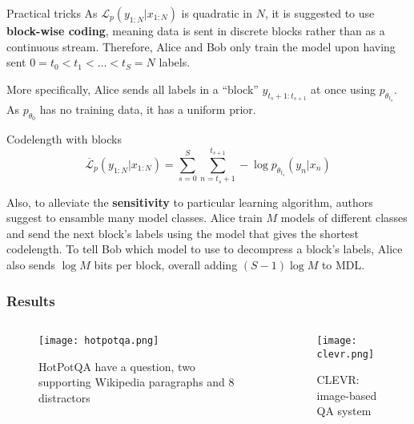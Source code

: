 \documentclass[10pt]{beamer}
\begin{document}
\begin{frame}{Practical tricks}
   As $\mathcal{L}_p(y_{1:N} |x_{1:N})$ is quadratic in $N$, it is suggested to use \textbf{block-wise coding}, meaning data is sent in discrete blocks rather than as a continuous stream. Therefore, Alice and Bob only train the model upon having sent $0 = t_0 <t_1 < \dots < t_S = N$ labels. 

   More specifically, Alice sends all labels in a ``block'' $y_{t_s+1:t_{s+1}}$ at once using $p_{\theta_{t_s}}$. As $p_{\theta_0}$ has no training data, it has a uniform prior.
    \begin{block}{Codelength with blocks}
         $$\overline{\mathcal{L}}_p(y_{1:N} |x_{1:N}) = \sum_{s=0}^S \sum_{n=t_s +1}^{t_{s +1}} -\log p_{\theta_{t_s}}(y_n |x_n)$$

    \end{block}
  



    Also, to alleviate the \textbf{sensitivity} to particular learning algorithm, authors suggest to ensamble many model classes. Alice train $M$ models of different classes and send the next block’s labels using the model that gives the shortest codelength. To tell Bob which model to use to decompress a block’s labels, Alice also sends $\log M$ bits per block, overall adding $(S  - 1) \log M$ to MDL.
\end{frame}

\begin{frame}
	\frametitle{Results}
\begin{columns}[onlytextwidth]
        \begin{column}{0.5\textwidth}
            \begin{figure}
                \centering
                \texttt{[image: hotpotqa.png]} 
                \caption{HotPotQA have a question, two supporting Wikipedia paragraphs and 8 distractors}
            \end{figure} 
        \end{column}
        \begin{column}{0.5\textwidth}
            \begin{figure}
                \centering
                \texttt{[image: clevr.png]} 
                \caption{CLEVR: image-based QA system}
            \end{figure}
        \end{column}
    \end{columns}
    
\end{frame}
\end{document}
